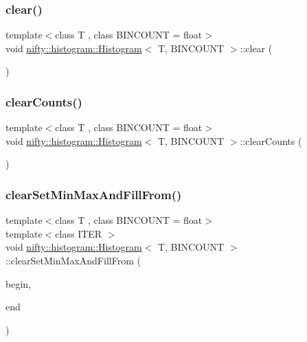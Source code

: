 \subsubsection{\texorpdfstring{clear()}{clear()}}
{\footnotesize\ttfamily template$<$class T , class B\+I\+N\+C\+O\+U\+NT  = float$>$ \\
void \hyperlink{classnifty_1_1histogram_1_1Histogram}{nifty\+::histogram\+::\+Histogram}$<$ T, B\+I\+N\+C\+O\+U\+NT $>$\+::clear (\begin{DoxyParamCaption}{ }\end{DoxyParamCaption})\hspace{0.3cm}{\ttfamily [inline]}}

\mbox{\label{classnifty_1_1histogram_1_1Histogram_ac6771f36d3c23a030650e55ff5bda1bf}} 
\subsubsection{\texorpdfstring{clear\+Counts()}{clearCounts()}}
{\footnotesize\ttfamily template$<$class T , class B\+I\+N\+C\+O\+U\+NT  = float$>$ \\
void \hyperlink{classnifty_1_1histogram_1_1Histogram}{nifty\+::histogram\+::\+Histogram}$<$ T, B\+I\+N\+C\+O\+U\+NT $>$\+::clear\+Counts (\begin{DoxyParamCaption}{ }\end{DoxyParamCaption})\hspace{0.3cm}{\ttfamily [inline]}}

\mbox{\label{classnifty_1_1histogram_1_1Histogram_a6dc9984784d563f8201c95a2c95bbc45}} 
\subsubsection{\texorpdfstring{clear\+Set\+Min\+Max\+And\+Fill\+From()}{clearSetMinMaxAndFillFrom()}}
{\footnotesize\ttfamily template$<$class T , class B\+I\+N\+C\+O\+U\+NT  = float$>$ \\
template$<$class I\+T\+ER $>$ \\
void \hyperlink{classnifty_1_1histogram_1_1Histogram}{nifty\+::histogram\+::\+Histogram}$<$ T, B\+I\+N\+C\+O\+U\+NT $>$\+::clear\+Set\+Min\+Max\+And\+Fill\+From (\begin{DoxyParamCaption}\item[{I\+T\+ER}]{begin,  }\item[{I\+T\+ER}]{end }\end{DoxyParamCaption})\hspace{0.3cm}{\ttfamily [inline]}}

